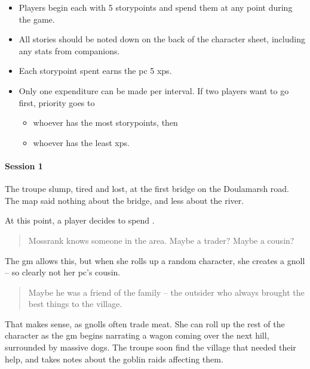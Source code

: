 \begin{multicols}{2}

\begin{itemize}
  \item
  Players begin each with 5 \glspl{storypoint} and spend them at any point during the game.
  \item
  All stories should be noted down on the back of the character sheet, including any stats from companions.
  \item
  Each \gls{storypoint} spent earns the \gls{pc} 5 \glspl{xp}.
  \item
  Only one expenditure can be made per \gls{interval}.
  If two players want to go first, priority goes to
  \begin{itemize}
    \item
    whoever has the most \glspl{storypoint}, then
    \item
    whoever has the least \glspl{xp}.
  \end{itemize}
\end{itemize}

\begin{exampletext}
  \paragraph{Session 1}
  The troupe slump, tired and lost, at the first bridge on the Doulamarsh road.
  The map said nothing about the bridge, and less about the river.

  At this point, a player decides to spend .

  \begin{quotation}
    Mossrank knows someone in the area.
    Maybe a trader?
    Maybe a cousin?
  \end{quotation}

  The \gls{gm} allows this, but when she rolls up a random character, she creates a gnoll -- so clearly not her \gls{pc}'s cousin.

  \begin{quotation}
    Maybe he was a friend of the family -- the outsider who always brought the best things to the \gls{village}.
  \end{quotation}

  That makes sense, as gnolls often trade meat.
  She can roll up the rest of the character as the \gls{gm} begins narrating a wagon coming over the next hill, surrounded by massive dogs.
  The troupe soon find the \gls{village} that needed their help, and takes notes about the goblin raids affecting them.


\end{exampletext}
\end{multicols}
